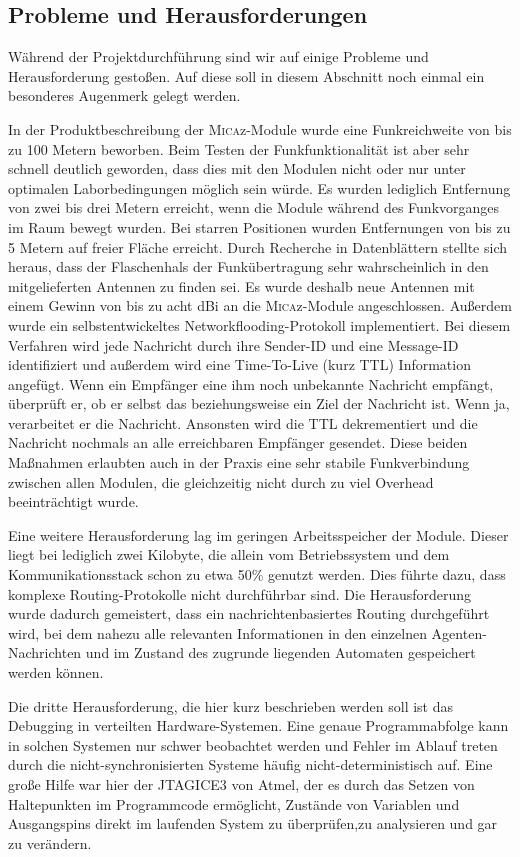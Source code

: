 \subsection{Probleme und Herausforderungen}

Während der Projektdurchführung sind wir auf einige Probleme und Herausforderung gestoßen. Auf diese soll in diesem Abschnitt noch einmal ein besonderes Augenmerk gelegt werden. 

In der Produktbeschreibung der \textsc{Mica}z-Module wurde eine Funkreichweite von bis zu 100 Metern beworben. Beim Testen der Funkfunktionalität ist aber sehr schnell deutlich geworden, dass dies mit den Modulen nicht oder nur unter optimalen Laborbedingungen möglich sein würde. Es wurden lediglich Entfernung von zwei bis drei Metern erreicht, wenn die Module während des Funkvorganges im Raum bewegt wurden. Bei starren Positionen wurden Entfernungen von bis zu 5 Metern auf freier Fläche erreicht. Durch Recherche in Datenblättern stellte sich heraus, dass der Flaschenhals der Funkübertragung sehr wahrscheinlich in den mitgelieferten Antennen zu finden sei. Es wurde deshalb neue Antennen mit einem Gewinn von bis zu acht dBi an die \textsc{Mica}z-Module angeschlossen. Außerdem wurde ein selbstentwickeltes Networkflooding-Protokoll implementiert. Bei diesem Verfahren wird jede Nachricht durch ihre Sender-ID und eine Message-ID identifiziert und außerdem wird eine Time-To-Live (kurz TTL) Information angefügt. Wenn ein Empfänger eine ihm noch unbekannte Nachricht empfängt, überprüft er, ob er selbst das beziehungsweise ein Ziel der Nachricht ist. Wenn ja, verarbeitet er die Nachricht. Ansonsten wird die TTL dekrementiert und die Nachricht nochmals an alle erreichbaren Empfänger gesendet.
Diese beiden Maßnahmen erlaubten auch in der Praxis eine sehr stabile Funkverbindung zwischen allen Modulen, die gleichzeitig nicht durch zu viel Overhead beeinträchtigt wurde.

Eine weitere Herausforderung lag im geringen Arbeitsspeicher der Module. Dieser liegt bei lediglich zwei Kilobyte, die allein vom Betriebssystem und dem Kommunikationsstack schon zu etwa 50\% genutzt werden. Dies führte dazu, dass komplexe Routing-Protokolle nicht durchführbar sind. Die Herausforderung wurde dadurch gemeistert, dass ein nachrichtenbasiertes Routing durchgeführt wird, bei dem nahezu alle relevanten Informationen in den einzelnen Agenten-Nachrichten und im Zustand des zugrunde liegenden Automaten gespeichert werden können. 

Die dritte Herausforderung, die hier kurz beschrieben werden soll ist das Debugging in verteilten Hardware-Systemen. Eine genaue Programmabfolge kann in solchen Systemen nur schwer beobachtet werden und Fehler im Ablauf treten durch die nicht-synchronisierten Systeme häufig nicht-deterministisch auf.
Eine große Hilfe war hier der JTAGICE3 von Atmel, der es durch das Setzen von Haltepunkten im Programmcode ermöglicht, Zustände von Variablen und Ausgangspins direkt im laufenden System zu überprüfen,zu analysieren und gar zu verändern.


